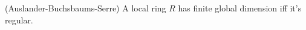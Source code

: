


\begin{theorem} (Auslander-Buchsbaums-Serre)
	\label{thm:loc_ring_reg_iff_fin_globdim}
	A local ring $R$ has finite global dimension iff it's regular.
\end{theorem}

